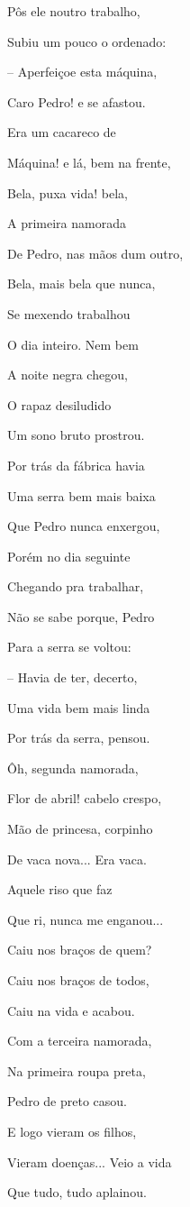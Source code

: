 Pôs ele noutro trabalho,

Subiu um pouco o ordenado:

-- Aperfeiçoe esta máquina,

Caro Pedro! e se afastou.

Era um cacareco de

Máquina! e lá, bem na frente,

Bela, puxa vida! bela,

A primeira namorada

De Pedro, nas mãos dum outro,

Bela, mais bela que nunca,

Se mexendo trabalhou

O dia inteiro. Nem bem

A noite negra chegou,

O rapaz desiludido

Um sono bruto prostrou.

Por trás da fábrica havia

Uma serra bem mais baixa

Que Pedro nunca enxergou,

Porém no dia seguinte

Chegando pra trabalhar,

Não se sabe porque, Pedro

Para a serra se voltou:

-- Havia de ter, decerto,

Uma vida bem mais linda

Por trás da serra, pensou.

Ôh, segunda namorada,

Flor de abril! cabelo crespo,

Mão de princesa, corpinho

De vaca nova... Era vaca.

Aquele riso que faz

Que ri, nunca me enganou...

Caiu nos braços de quem?

Caiu nos braços de todos,

Caiu na vida e acabou.

Com a terceira namorada,

Na primeira roupa preta,

Pedro de preto casou.

E logo vieram os filhos,

Vieram doenças... Veio a vida

Que tudo, tudo aplainou.

